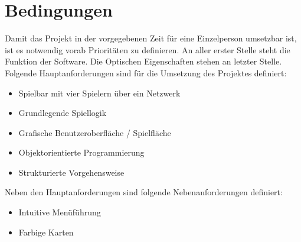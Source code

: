 
\chapter{Bedingungen}
\label{ch:bedingungen}
Damit das Projekt in der vorgegebenen Zeit für eine Einzelperson umsetzbar ist, ist es notwendig vorab Prioritäten zu definieren. An aller erster Stelle steht die Funktion der Software. Die Optischen Eigenschaften stehen an letzter Stelle. \\
Folgende Hauptanforderungen sind für die Umsetzung des Projektes definiert:
\begin{itemize}
	\item Spielbar mit vier Spielern über ein Netzwerk 
	\item Grundlegende Spiellogik
	\item Grafische Benutzeroberfläche / Spielfläche
	\item Objektorientierte Programmierung
	\item Strukturierte Vorgehensweise
\end{itemize}
Neben den Hauptanforderungen sind folgende Nebenanforderungen definiert:
\begin{itemize}
	\item Intuitive Menüführung
	\item Farbige Karten
\end{itemize}
